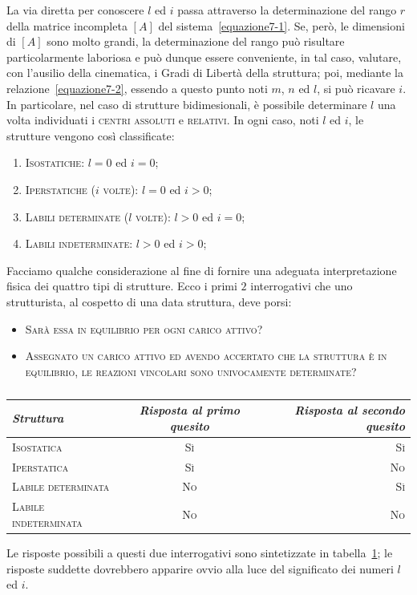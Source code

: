 \noindent La via diretta per conoscere $l$ ed $i$ passa attraverso la determinazione del rango $r$ della matrice incompleta $[ A ]$ del sistema~\eqref{equazione7-1}. Se, però, le dimensioni di $[ A ]$ sono molto grandi, la determinazione del rango può risultare particolarmente laboriosa e può dunque essere conveniente, in tal caso, valutare, con l'ausilio della cinematica, i Gradi di Libertà della struttura; poi, mediante la relazione~\eqref{equazione7-2}, essendo a questo punto noti $m$, $n$ ed $l$, si può ricavare $i$. In particolare, nel caso di strutture bidimesionali, è possibile determinare $l$ una volta individuati i \textsc{centri assoluti} e \textsc{relativi}. In ogni caso, noti $l$ ed $i$, le strutture vengono così classificate:
\begin{enumerate}
\item \textsc{Isostatiche}: $l=0$ ed $i=0$;
\item \textsc{Iperstatiche} ($i$ \textsc{volte}): $l=0$ ed $i>0$;
\item \textsc{Labili determinate} ($l$ \textsc{volte}): $l>0$ ed $i=0$;
\item \textsc{Labili indeterminate}: $l>0$ ed $i>0$;
\end{enumerate}
\noindent Facciamo qualche considerazione al fine di fornire una adeguata interpretazione fisica dei quattro tipi di strutture. Ecco i primi $2$ interrogativi che uno strutturista, al cospetto di una data struttura, deve porsi:
\begin{itemize}
\item \textsc{Sarà essa in equilibrio per ogni carico attivo?}
\item \textsc{Assegnato un carico attivo ed avendo accertato che la struttura è in equilibrio, le reazioni vincolari sono univocamente determinate?}
\end{itemize}
\begin{table}
\renewcommand\thetable{7~-~1} 
\caption{}
\label{tabella7-1}
\centering
\begin{tabular}{lcr}
\toprule
\emph{Struttura}                & \emph{Risposta al primo quesito} & \emph{Risposta al secondo quesito} \\
\midrule
\textsc{Isostatica}               & \textsc{Sì}                               & \textsc{Sì} \\
\textsc{Iperstatica}              & \textsc{Sì}                               & \textsc{No} \\
\textsc{Labile determinata}   & \textsc{No}                              & \textsc{Sì} \\
\textsc{Labile indeterminata} & \textsc{No}                              & \textsc{No} \\
\bottomrule
\end{tabular}
\end{table}
Le risposte possibili a questi due interrogativi sono sintetizzate in tabella~\ref{tabella7-1}; le risposte suddette dovrebbero apparire ovvio alla luce del significato dei numeri $l$ ed $i$. 